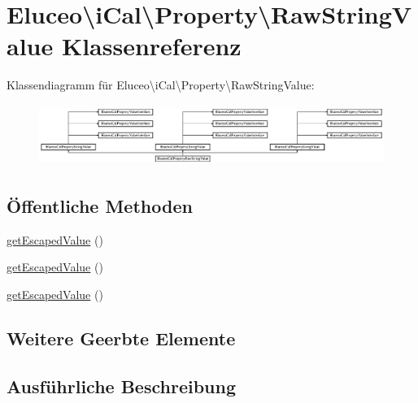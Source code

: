 \hypertarget{class_eluceo_1_1i_cal_1_1_property_1_1_raw_string_value}{}\section{Eluceo\textbackslash{}i\+Cal\textbackslash{}Property\textbackslash{}Raw\+String\+Value Klassenreferenz}
\label{class_eluceo_1_1i_cal_1_1_property_1_1_raw_string_value}
Klassendiagramm für Eluceo\textbackslash{}i\+Cal\textbackslash{}Property\textbackslash{}Raw\+String\+Value\+:\begin{figure}[H]
\begin{center}
\leavevmode
\includegraphics[height=2.011494cm]{class_eluceo_1_1i_cal_1_1_property_1_1_raw_string_value}
\end{center}
\end{figure}
\subsection*{Öffentliche Methoden}
\begin{DoxyCompactItemize}
\item 
\mbox{\hyperlink{class_eluceo_1_1i_cal_1_1_property_1_1_raw_string_value_a4759366e5ac3a3eb9c4b57704c71b05f}{get\+Escaped\+Value}} ()
\item 
\mbox{\hyperlink{class_eluceo_1_1i_cal_1_1_property_1_1_raw_string_value_a4759366e5ac3a3eb9c4b57704c71b05f}{get\+Escaped\+Value}} ()
\item 
\mbox{\hyperlink{class_eluceo_1_1i_cal_1_1_property_1_1_raw_string_value_a4759366e5ac3a3eb9c4b57704c71b05f}{get\+Escaped\+Value}} ()
\end{DoxyCompactItemize}
\subsection*{Weitere Geerbte Elemente}


\subsection{Ausführliche Beschreibung}


